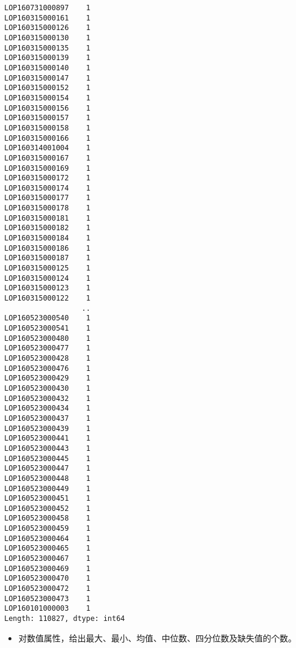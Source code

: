 \documentclass[11pt]{article}
\providecommand{\tightlist}{%
      \setlength{\itemsep}{0pt}\setlength{\parskip}{0pt}}
\begin{document}
\begin{Verbatim}[commandchars=\\\{\}]
LOP160731000897    1
LOP160315000161    1
LOP160315000126    1
LOP160315000130    1
LOP160315000135    1
LOP160315000139    1
LOP160315000140    1
LOP160315000147    1
LOP160315000152    1
LOP160315000154    1
LOP160315000156    1
LOP160315000157    1
LOP160315000158    1
LOP160315000166    1
LOP160314001004    1
LOP160315000167    1
LOP160315000169    1
LOP160315000172    1
LOP160315000174    1
LOP160315000177    1
LOP160315000178    1
LOP160315000181    1
LOP160315000182    1
LOP160315000184    1
LOP160315000186    1
LOP160315000187    1
LOP160315000125    1
LOP160315000124    1
LOP160315000123    1
LOP160315000122    1
                  ..
LOP160523000540    1
LOP160523000541    1
LOP160523000480    1
LOP160523000477    1
LOP160523000428    1
LOP160523000476    1
LOP160523000429    1
LOP160523000430    1
LOP160523000432    1
LOP160523000434    1
LOP160523000437    1
LOP160523000439    1
LOP160523000441    1
LOP160523000443    1
LOP160523000445    1
LOP160523000447    1
LOP160523000448    1
LOP160523000449    1
LOP160523000451    1
LOP160523000452    1
LOP160523000458    1
LOP160523000459    1
LOP160523000464    1
LOP160523000465    1
LOP160523000467    1
LOP160523000469    1
LOP160523000470    1
LOP160523000472    1
LOP160523000473    1
LOP160101000003    1
Length: 110827, dtype: int64

    \end{Verbatim}

    \begin{itemize}
\tightlist
\item
  对数值属性，给出最大、最小、均值、中位数、四分位数及缺失值的个数。
\end{itemize}
\end{document}
